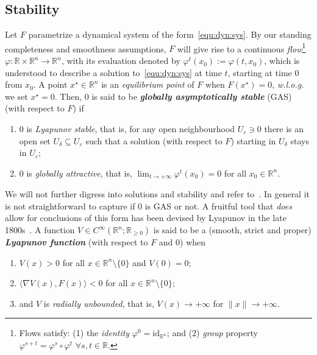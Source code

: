 \documentclass[letterpaper, 10 pt, conference]{ieeeconf}  %
\theoremstyle{mystyle}
\begin{document}
\subsection{Stability}
\label{sec:stability}
Let $F$ parametrize a dynamical system of the form~\eqref{equ:dyn:sys}. By our standing completeness and smoothness assumptions, $F$ will give rise to a continuous \textit{flow}\footnote{Flows satisfy: (1) the \textit{identity} $\varphi^0=\mathrm{id}_{\mathbb{R}^n}$; and (2) \textit{group} property $\varphi^{s+t}=\varphi^s\circ\varphi^t$ $\forall s,t\in \mathbb{R}$.} $\varphi:\mathbb{R}\times \mathbb{R}^n\to \mathbb{R}^n$, with its evaluation denoted by $\varphi^t(x_0):=\varphi(t,x_0)$, which is understood to describe a solution to~\eqref{equ:dyn:sys} at time $t$, starting at time $0$ from $x_0$. A point $x^{\star}\in \mathbb{R}^n$ is an \textit{equilibrium point} of $F$ when $F(x^{\star})=0$, \textit{w.l.o.g.} we set $x^{\star}=0$. Then, $0$ is said to be \textit{\textbf{globally asymptotically stable}} (GAS) (with respect to $F$) if 
\begin{enumerate}[(s-i)]
    \item $0$ is \textit{Lyapunov stable}, that is, for any open neighbourhood $U_{\varepsilon}\ni 0$ there is an open set $U_{\delta}\subseteq U_{\varepsilon}$ such that a solution (with respect to $F$) starting in $U_{\delta}$ stays in $U_{\varepsilon}$;
    \item $0$ is \textit{globally attractive}, that is, $\lim_{t\to+\infty}\varphi^t(x_0)=0$ for all $x_0\in \mathbb{R}^n$.
\end{enumerate}
We will not further digress into solutions and stability and refer to~\cite{ref:sontag2013mathematical}. In general it is not straightforward to capture if $0$ is GAS or not. A fruitful tool that \textit{does} allow for conclusions of this form has been devised by Lyapunov in the late 1800s~\cite{ref:liapunov1892general}. A function $V\in C^{\infty}(\mathbb{R}^n;\mathbb{R}_{\geq 0})$ is said to be a (smooth, strict and proper) \textbf{\textit{Lyapunov function}} (with respect to $F$ and $0$) when
\begin{enumerate}[(V-i)]
    \item \label{prop:i:V}$V(x)>0$ for all $x\in \mathbb{R}^n\setminus\{0\}$ and $V(0)=0$;
    \item \label{prop:ii:V}$\langle \nabla V(x),F(x) \rangle <0$ for all $x\in \mathbb{R}^n\setminus\{0\}$;
    \item \label{prop:iii:V}and $V$ is \textit{radially unbounded}, that is, $V(x)\to +\infty$ for $\|x\|\to+\infty$.
\end{enumerate}
\end{document}
